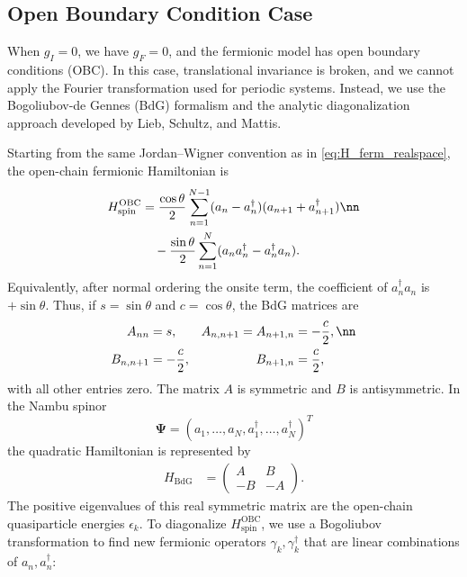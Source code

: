 \clearpage
\subsection{Open Boundary Condition Case}

When $g_I=0$, we have $g_F=0$, and the fermionic model has open boundary conditions (OBC). In this case, translational invariance is broken, and we cannot apply the Fourier transformation used for periodic systems. Instead, we use the Bogoliubov-de Gennes (BdG) formalism and the analytic diagonalization approach developed by Lieb, Schultz, and Mattis.

Starting from the same Jordan--Wigner convention as in \cref{eq:H_ferm_realspace}, the open-chain fermionic Hamiltonian is
\begin{align}
    H_{\mathrm{spin}}^{\mathrm{OBC}}
        &= \frac{\cos\theta}{2}\sum_{n=1}^{N-1}
           (a_n-a_n^\dag)(a_{n+1}+a_{n+1}^\dag) \nn\\
        &\quad
           -\frac{\sin\theta}{2}\sum_{n=1}^{N}
           (a_n a_n^\dag-a_n^\dag a_n).
    \label{eq:H_obc_fermion_canonical}
\end{align}
Equivalently, after normal ordering the onsite term, the coefficient of $a_n^\dag a_n$ is $+\sin\theta$.  Thus, if $s=\sin\theta$ and $c=\cos\theta$, the BdG matrices are
\begin{align}
    A_{nn} &= s, &
    A_{n,n+1}=A_{n+1,n} &= -\frac{c}{2}, \nn\\
    B_{n,n+1} &= -\frac{c}{2}, &
    B_{n+1,n} &= \frac{c}{2},
    \label{eq:obc_AB_canonical}
\end{align}
with all other entries zero.  The matrix $A$ is symmetric and $B$ is antisymmetric.  In the Nambu spinor
\begin{equation}
    \bm{\Psi}=(a_1,\ldots,a_N,a_1^\dag,\ldots,a_N^\dag)^T
\end{equation}
the quadratic Hamiltonian is represented by
\begin{align}
    H_{\mathrm{BdG}} &=
    \begin{pmatrix}
        A  &B\\
        -B &-A
    \end{pmatrix}.
    \label{eq:obc_bdg_matrix}
\end{align}
The positive eigenvalues of this real symmetric matrix are the open-chain quasiparticle energies $\epsilon_k$.
To diagonalize $H_{\mathrm{spin}}^{\mathrm{OBC}}$, we use a Bogoliubov transformation to find new fermionic operators $\gamma_k, \gamma_k^\dag$ that are linear combinations of $a_n, a_n^\dag$:
